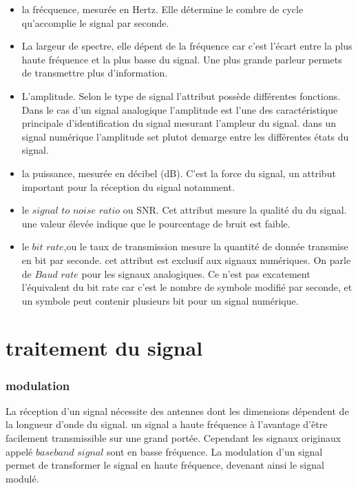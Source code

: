 \documentclass[12pt,a4paper,oneside, titlepage]{report}
\begin{document}
\begin{itemize}

\item la frécquence, mesurée en Hertz. Elle détermine le combre de cycle qu'accomplie le signal par seconde.
\item La largeur de spectre, elle dépent de la fréquence car c'est l'écart entre la plus haute fréquence et la plus basse du signal. Une plus grande parleur permets de transmettre plus d'information.
\item L'amplitude. Selon le type de signal l'attribut possède différentes fonctions. Dans le cas d'un signal analogique l'amplitude est l'une des caractéristique principale d'identification du signal mesurant l'ampleur du signal. dans un signal numérique l'amplitude set plutot demarge entre les différentes états du signal. 
\item la puissance, mesurée en décibel (dB). C'est la force du signal, un attribut important pour la réception du signal notamment.
\item le $signal$ $to$ $noise$ $ratio$ ou SNR. Cet attribut mesure la qualité du du signal. une valeur élevée indique que le pourcentage de bruit est faible.
\item le $bit$ $rate$,ou le taux de transmission mesure la quantité de donnée transmise en bit par seconde. cet attribut est exclusif aux signaux numériques. On parle de $Baud$ $rate$ pour les signaux analogiques. Ce n'est pas excatement l'équivalent du bit rate car c'est le nombre de symbole modifié par seconde, et un symbole peut contenir plusieurs bit pour un signal numérique.

\end{itemize}

\section{traitement du signal}

\subsubsection{modulation}

La réception d'un signal nécessite des antennes dont les dimensions dépendent de la longueur d'onde du signal. un signal a haute fréquence à l'avantage d'être facilement transmissible sur une grand portée. Cependant les signaux originaux appelé $baseband$ $signal$ sont en basse fréquence. La modulation d'un signal permet de transformer le signal en haute fréquence, devenant ainsi le signal modulé.
\end{document}
